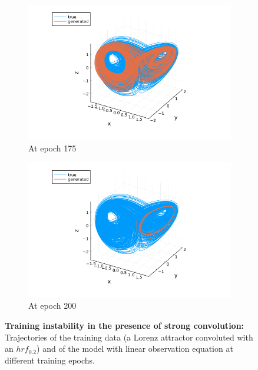 \begin{figure}
\begin{subfigure}[b]{0.24\textwidth}
        \includegraphics[width=\textwidth]{Images/training_epochs/traj_gen_3d_175.png}
        \caption{At epoch 175}
        \label{fig:traj_gen_3d_175}
    \end{subfigure}%
    \begin{subfigure}[b]{0.24\textwidth}
        \includegraphics[width=\textwidth]{Images/training_epochs/traj_gen_3d_200.png}
        \caption{At epoch 200}
        \label{fig:traj_gen_3d_200}
    \end{subfigure}
       \caption[Training instability in the presence of strong convolution]{\textbf{Training instability in the presence of strong convolution: } Trajectories of the training data 
       (a Lorenz attractor convoluted with an $hrf_{0.2}$) and of the model with linear observation equation at different training epochs.}
       \label{fig:traj_gen_3d}
\end{figure}
   
